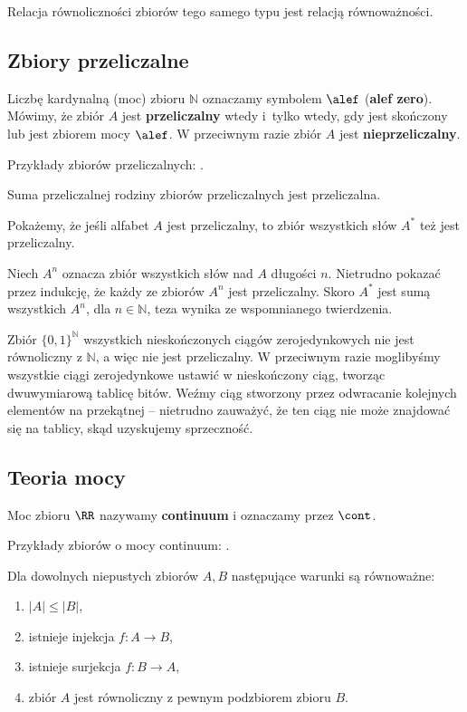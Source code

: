 Relacja równoliczności zbiorów tego samego typu jest relacją równoważności.

\subsection{Zbiory przeliczalne}
Liczbę kardynalną (moc) zbioru $\mathbb{N}$ oznaczamy symbolem
$\alef$ (\textbf{alef zero}). Mówimy, że zbiór $A$ jest \textbf{przeliczalny} wtedy i~tylko wtedy, gdy jest skończony lub jest zbiorem mocy $\alef$. W przeciwnym razie zbiór $A$ jest \textbf{nieprzeliczalny}.

Przykłady zbiorów przeliczalnych: .

Suma przeliczalnej rodziny zbiorów przeliczalnych jest przeliczalna.

\begin{example}
    Pokażemy, że jeśli alfabet $A$ jest przeliczalny, to zbiór wszystkich słów
    $A^*$ też jest przeliczalny.

    Niech $A^n$ oznacza zbiór wszystkich słów nad $A$ długości $n$. 
    Nietrudno pokazać przez indukcję, że każdy ze zbiorów $A^n$ jest przeliczalny. 
    Skoro $A^*$ jest sumą wszystkich $A^n$, dla $n \in \mathbb{N}$, teza wynika 
    ze wspomnianego twierdzenia.
\end{example}

\begin{example}
    Zbiór $\{ 0, 1 \}^\mathbb{N}$ wszystkich nieskończonych ciągów zerojedynkowych nie jest równoliczny z $\mathbb{N}$,
    a więc nie jest przeliczalny. W przeciwnym razie moglibyśmy wszystkie ciągi zerojedynkowe ustawić w nieskończony ciąg,
    tworząc dwuwymiarową tablicę bitów.
    Weźmy ciąg stworzony przez odwracanie kolejnych elementów na przekątnej -- nietrudno zauważyć, że ten ciąg nie może znajdować się na tablicy, skąd uzyskujemy sprzeczność.
\end{example}

\subsection{Teoria mocy}

Moc zbioru $\RR$ nazywamy \textbf{continuum} i oznaczamy przez $\cont$. 

Przykłady zbiorów o mocy continuum: .
\bigskip

Dla dowolnych niepustych zbiorów $A, B$ następujące warunki są równoważne:
\begin{enumerate}
    \item $|A| \leq |B|$,
    \item istnieje injekcja $f : A \to B$, 
    \item istnieje surjekcja $f : B \to A$,
    \item zbiór $A$ jest równoliczny z pewnym podzbiorem zbioru $B$.
\end{enumerate}

